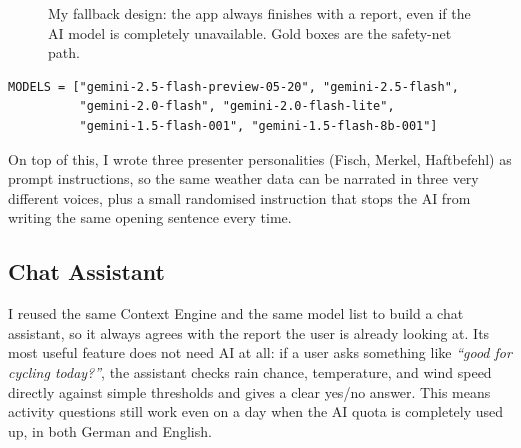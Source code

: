 \documentclass[11pt, a4paper]{article}
\begin{document}
\begin{figure}[H]
  \centering
  \caption{My fallback design: the app always finishes with a report, even if the AI
           model is completely unavailable. Gold boxes are the safety-net path.}
  \label{fig:fallback}
\end{figure}

\begin{lstlisting}[style=pythonstyle, caption={The six models I use, in the order I try
  them. Each one has its own separate daily quota.}]
MODELS = ["gemini-2.5-flash-preview-05-20", "gemini-2.5-flash",
          "gemini-2.0-flash", "gemini-2.0-flash-lite",
          "gemini-1.5-flash-001", "gemini-1.5-flash-8b-001"]
\end{lstlisting}

On top of this, I wrote three presenter personalities (Fisch, Merkel, Haftbefehl) as
prompt instructions, so the same weather data can be narrated in three very different
voices, plus a small randomised instruction that stops the AI from writing the same
opening sentence every time.

\subsection{Chat Assistant}

I reused the same Context Engine and the same model list to build a chat assistant, so it
always agrees with the report the user is already looking at. Its most useful feature does
not need AI at all: if a user asks something like \textit{``good for cycling today?''}, the
assistant checks rain chance, temperature, and wind speed directly against simple
thresholds and gives a clear yes/no answer. This means activity questions still work even
on a day when the AI quota is completely used up, in both German and English.
\end{document}
